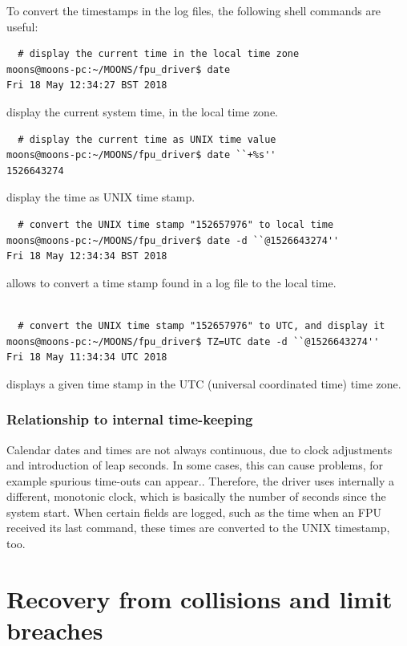 \documentclass[11pt,a4paper]{scrartcl}
\begin{document}
To convert the timestamps in the log files, the following
shell commands are useful:

\begin{verbatim}
  # display the current time in the local time zone
moons@moons-pc:~/MOONS/fpu_driver$ date
Fri 18 May 12:34:27 BST 2018
\end{verbatim}
display the current system time, in the local time zone.

\begin{verbatim}
  # display the current time as UNIX time value
moons@moons-pc:~/MOONS/fpu_driver$ date ``+%s''
1526643274
\end{verbatim}
display the time as UNIX time stamp.

\begin{verbatim}
  # convert the UNIX time stamp "152657976" to local time
moons@moons-pc:~/MOONS/fpu_driver$ date -d ``@1526643274''
Fri 18 May 12:34:34 BST 2018
\end{verbatim}
allows to convert a time stamp found in a log file to
the local time.

\begin{verbatim}
  
  # convert the UNIX time stamp "152657976" to UTC, and display it
moons@moons-pc:~/MOONS/fpu_driver$ TZ=UTC date -d ``@1526643274''
Fri 18 May 11:34:34 UTC 2018
\end{verbatim}
displays a given time stamp in the UTC (universal coordinated time)
time zone.

\subsubsection{Relationship to internal time-keeping}
Calendar dates and times are not always continuous, due to clock
adjustments and introduction of leap seconds. In some cases, this can
cause problems, for example spurious time-outs can appear.. Therefore,
the driver uses internally a different, monotonic clock, which is
basically the number of seconds since the system start. When certain
fields are logged, such as the time when an FPU received its last
command, these times are converted to the UNIX timestamp, too.


\section{Recovery from collisions and limit breaches}
\label{sec:recovery}
\end{document}
